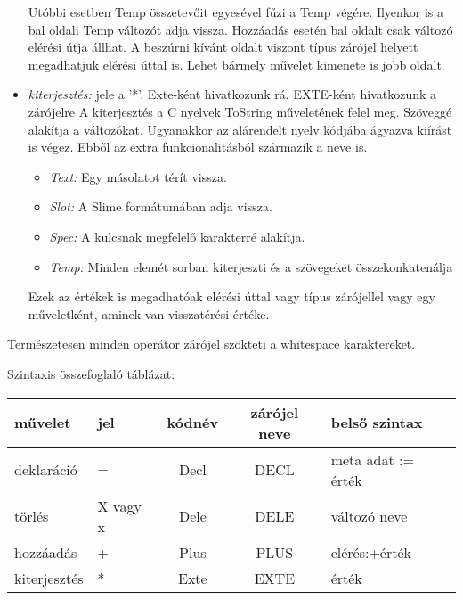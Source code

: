 \begin{itemize}
\begin{itemize}
\end{itemize} 
Utóbbi esetben Temp összetevőit egyesével fűzi a Temp végére. 
Ilyenkor is a bal oldali Temp változót adja vissza.
Hozzáadás esetén bal oldalt csak változó elérési útja állhat.
A beszúrni kívánt oldalt viszont típus zárójel helyett megadhatjuk elérési úttal is.
Lehet bármely művelet kimenete is jobb oldalt.
\item \emph{kiterjesztés:}
jele a '*'.
Exte-ként hivatkozunk rá.
EXTE-ként hivatkozunk a zárójelre
A kiterjesztés a C nyelvek ToString műveletének felel meg. 
Szöveggé alakítja a változókat.
Ugyanakkor az alárendelt nyelv kódjába ágyazva kiírást is végez. 
Ebből az extra funkcionalitásból származik a neve is.
\begin{itemize}
\item\emph{Text:} Egy másolatot térít vissza.
\item\emph{Slot:} A Slime formátumában adja vissza.
\item\emph{Spec:} A kulcsnak megfelelő karakterré alakítja.
\item\emph{Temp:} Minden elemét sorban kiterjeszti és a szövegeket összekonkatenálja
\end{itemize}
Ezek az értékek is megadhatóak elérési úttal vagy típus zárójellel vagy egy műveletként, aminek van visszatérési értéke.
\end{itemize}

Természetesen minden operátor zárójel szökteti a whitespace karaktereket.

Szintaxis összefoglaló táblázat:
\begin{center}
  \begin{tabular}{ | l | l | c | c | l |}
    \hline
    művelet		& jel	 	& kódnév 		& zárójel neve	& belső szintax		\\ \hline
    deklaráció	& = 		& Decl		 	& DECL			& meta adat := érték\\ \hline
    törlés		& X vagy x	& Dele		 	& DELE			& változó neve		\\ \hline
    hozzáadás	& + 		& Plus		 	& PLUS			& elérés:+érték		\\ \hline
    kiterjesztés& * 		& Exte		 	& EXTE			& érték				\\
    \hline
  \end{tabular}
\end{center}

